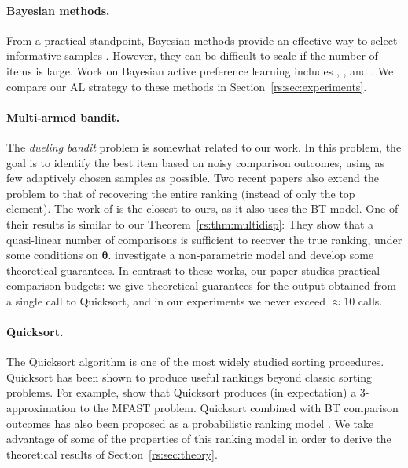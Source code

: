 \paragraph{Bayesian methods.}
From a practical standpoint, Bayesian methods provide an effective way to select informative samples \citep{mackay1992bayesian}.
However, they can be difficult to scale if the number of items is large.
Work on Bayesian active preference learning includes
\citet{chu2005extensions}, \citet{houlsby2012collaborative}, \citet{salimans2012collaborative} and \citet{chen2013pairwise}.
We compare our AL strategy to these methods in Section~\ref{rs:sec:experiments}.

\paragraph{Multi-armed bandit.}
The \emph{dueling bandit} problem \citep{yue2009karmed} is somewhat related to our work.
In this problem, the goal is to identify the best item based on noisy comparison outcomes, using as few adaptively chosen samples as possible.
Two recent papers also extend the problem to that of recovering the entire ranking (instead of only the top element).
The work of \citet{szorenyi2015online} is the closest to ours, as it also uses the BT model.
One of their results is similar to our Theorem~\ref{rs:thm:multidisp}: They show that a quasi-linear number of comparisons is sufficient to recover the true ranking, under some conditions on $\bm{\theta}$.
\citet{heckel2016active} investigate a non-parametric model and develop some theoretical guarantees.
In contrast to these works, our paper studies practical comparison budgets: we give theoretical guarantees for the output obtained from a single call to Quicksort, and in our experiments we never exceed $\approx 10$ calls.

\paragraph{Quicksort.}
The Quicksort algorithm \citep{hoare1962quicksort} is one of the most widely studied sorting procedures.
Quicksort has been shown to produce useful rankings beyond classic sorting problems.
For example, \citet{ailon2008aggregating} show that Quicksort produces (in expectation) a $3$-approximation to the MFAST problem.
Quicksort combined with BT comparison outcomes has also been proposed as a probabilistic ranking model \citep{ailon2008reconciling}.
We take advantage of some of the properties of this ranking model in order to derive the theoretical results of Section~\ref{rs:sec:theory}.
